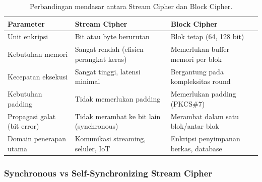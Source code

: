 \begin{table}[htbp]
  \centering
  \small
  \begin{tabular}{lll}
    \toprule
    \textbf{Parameter} & \textbf{Stream Cipher} & \textbf{Block Cipher} \\
    \midrule
    Unit enkripsi & Bit atau byte berurutan & Blok tetap (64, 128 bit) \\
    Kebutuhan memori & Sangat rendah (efisien perangkat keras) & Memerlukan buffer memori per blok \\
    Kecepatan eksekusi & Sangat tinggi, latensi minimal & Bergantung pada kompleksitas round \\
    Kebutuhan padding & Tidak memerlukan padding & Memerlukan padding (PKCS\#7) \\
    Propagasi galat (bit error) & Tidak merambat ke bit lain (synchronous) & Merambat dalam satu blok/antar blok \\
    Domain penerapan utama & Komunikasi streaming, seluler, IoT & Enkripsi penyimpanan berkas, database \\
    \bottomrule
  \end{tabular}
  \caption{Perbandingan mendasar antara Stream Cipher dan Block Cipher.}
  \label{tab:stream-vs-block}
\end{table}

\subsubsection{Synchronous vs Self-Synchronizing Stream Cipher}

